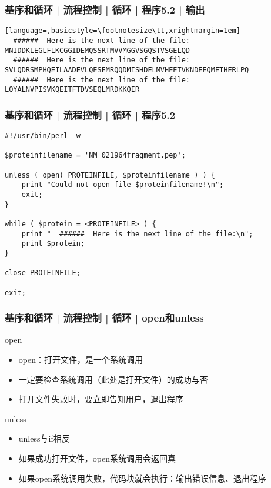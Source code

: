\begin{frame}[fragile]
  \frametitle{基序和循环 | 流程控制 | 循环 | 程序5.2 | 输出}
  \begin{lstlisting}[language=,basicstyle=\footnotesize\tt,xrightmargin=1em]
  ######  Here is the next line of the file:
MNIDDKLEGLFLKCGGIDEMQSSRTMVVMGGVSGQSTVSGELQD
  ######  Here is the next line of the file:
SVLQDRSMPHQEILAADEVLQESEMRQQDMISHDELMVHEETVKNDEEQMETHERLPQ
  ######  Here is the next line of the file:
LQYALNVPISVKQEITFTDVSEQLMRDKKQIR
\end{lstlisting}  
\end{frame}

\begin{frame}[fragile]
  \frametitle{基序和循环 | 流程控制 | 循环 | \alert{程序5.2}}
\begin{lstlisting}[basicstyle=\footnotesize\tt]
#!/usr/bin/perl -w

$proteinfilename = 'NM_021964fragment.pep';

unless ( open( PROTEINFILE, $proteinfilename ) ) {
    print "Could not open file $proteinfilename!\n";
    exit;
}

while ( $protein = <PROTEINFILE> ) {
    print "  ######  Here is the next line of the file:\n";
    print $protein;
}

close PROTEINFILE;

exit;
\end{lstlisting}  
\end{frame}

\begin{frame}
  \frametitle{基序和循环 | 流程控制 | 循环 | \alert{open和unless}}
  \begin{block}{open}
    \begin{itemize}
      \item open：打开文件，是一个系统调用
      \item 一定要检查系统调用（此处是打开文件）的成功与否
      \item 打开文件失败时，要立即告知用户，退出程序
    \end{itemize}
  \end{block}
  \pause
  \begin{block}{unless}
    \begin{itemize}
      \item unless与if相反
      \item 如果成功打开文件，open系统调用会返回真
      \item 如果open系统调用失败，代码块就会执行：输出错误信息、退出程序
    \end{itemize}
  \end{block}
\end{frame}

